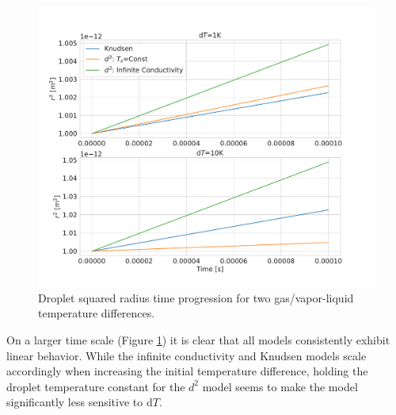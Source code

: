 \documentclass[12pt]{article}
\numberwithin{equation}{section}
\begin{document}
\begin{figure}[H]
    \centering
    \includegraphics[trim={0 30 0 40},clip,width=1.0\textwidth]{Figures/r_sq_hom_vs_D2_lin.pdf}
    \caption{Droplet squared radius time progression for two gas/vapor-liquid temperature differences.}
    \label{f:r_sq_hom_vs_D2}
\end{figure}
On a larger time scale (Figure \ref{f:r_sq_hom_vs_D2}) it is clear that all models consistently exhibit linear behavior. While the infinite conductivity and Knudsen models scale accordingly when increasing the initial temperature difference, holding the droplet temperature constant for the $d^{2}$ model seems to make the model significantly less sensitive to $\mathrm{d}T$.
\end{document}
